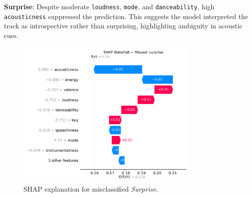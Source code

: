 \documentclass{article}
\begin{document}
\textbf{Surprise}: Despite moderate \texttt{loudness}, \texttt{mode}, and \texttt{danceability}, high \texttt{acousticness} suppressed the prediction. This suggests the model interpreted the track as introspective rather than surprising, highlighting ambiguity in acoustic cues.

\begin{figure}[H]
\centering
\includegraphics[width=0.8\textwidth]{Graphics/shap_missed_labels/surprise_missed_shap_waterfall.png}
\caption{SHAP explanation for misclassified \textit{Surprise}.}
\label{fig:shap_surprise_waterfall}
\end{figure}
\FloatBarrier
\end{document}
